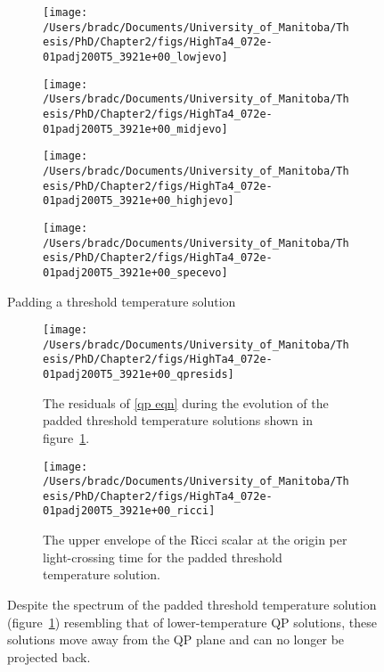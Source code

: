 \documentclass[../PhD.tex]{subfiles}
\begin{document}
\begin{figure}[h]
	\centering
	\begin{subfigure}[t]{0.45\textwidth}
		\texttt{[image: /Users/bradc/Documents/University\_of\_Manitoba/Thesis/PhD/Chapter2/figs/HighTa4\_072e-01padj200T5\_3921e+00\_lowjevo]}
	\end{subfigure}
	\;
	\begin{subfigure}[t]{0.45\textwidth}
		\texttt{[image: /Users/bradc/Documents/University\_of\_Manitoba/Thesis/PhD/Chapter2/figs/HighTa4\_072e-01padj200T5\_3921e+00\_midjevo]}
	\end{subfigure}
	\;
	\begin{subfigure}[t]{0.45\textwidth}
		\texttt{[image: /Users/bradc/Documents/University\_of\_Manitoba/Thesis/PhD/Chapter2/figs/HighTa4\_072e-01padj200T5\_3921e+00\_highjevo]}
	\end{subfigure}
	\;
	\begin{subfigure}[t]{0.45\textwidth}
		\texttt{[image: /Users/bradc/Documents/University\_of\_Manitoba/Thesis/PhD/Chapter2/figs/HighTa4\_072e-01padj200T5\_3921e+00\_specevo]}
	\end{subfigure}
	\caption{Padding a threshold temperature solution}
	\label{fig:HighTa4_072e-01padj200T5_3921e+00_evo}
\end{figure}

\begin{figure}[ht]
	\centering
	\begin{subfigure}[t]{0.45\textwidth}
		\texttt{[image: /Users/bradc/Documents/University\_of\_Manitoba/Thesis/PhD/Chapter2/figs/HighTa4\_072e-01padj200T5\_3921e+00\_qpresids]}
		\caption{The residuals of \eqref{qp eqn} during the evolution of the padded threshold temperature solutions shown in figure~\ref{fig:HighTa4_072e-01padj200T5_3921e+00_evo}.}
	\end{subfigure}
	\;
	\begin{subfigure}[t]{0.45\textwidth}
		\texttt{[image: /Users/bradc/Documents/University\_of\_Manitoba/Thesis/PhD/Chapter2/figs/HighTa4\_072e-01padj200T5\_3921e+00\_ricci]}
		\caption{The upper envelope of the Ricci scalar at the origin per light-crossing time for the padded threshold temperature solution.}
	\end{subfigure}
	\caption{Despite the spectrum of the padded threshold temperature solution (figure~\ref{fig:HighTa4_072e-01padj200T5_3921e+00_evo}) resembling that of lower-temperature QP solutions, these solutions move away from the QP plane and can no longer be projected back.}
	\label{fig: HighTa4_072e-01padj200T5_3921e+00_projections}
\end{figure}
\end{document}
